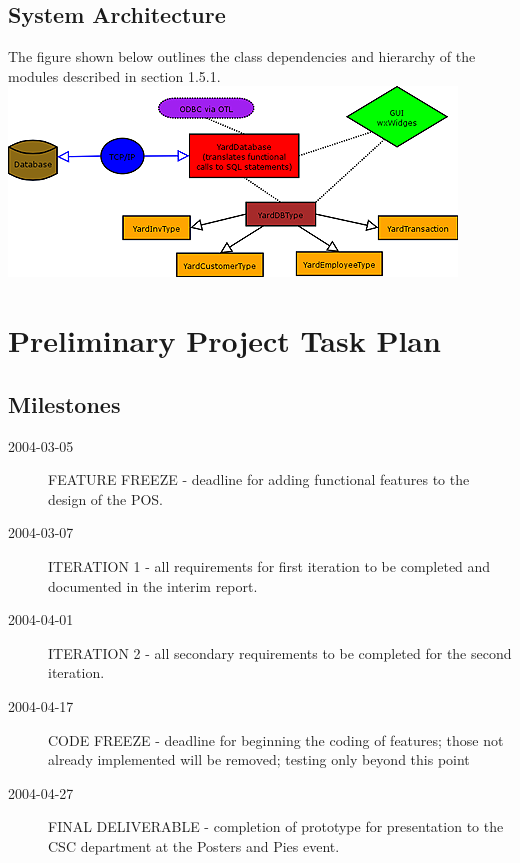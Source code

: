\documentclass{report}
\begin{document}
        \newpage


        \subsection{System Architecture}

            The figure shown below outlines the class dependencies and hierarchy of
            the modules described in section 1.5.1.\\

            \includegraphics{yardsale_modules.png}\\

    \section{Preliminary Project Task Plan}

        \subsection{Milestones}
            \begin{description}
                \item[2004-03-05] FEATURE FREEZE - deadline for adding functional
                features to the design of the POS.

                \item[2004-03-07] ITERATION 1 - all requirements for first
                iteration to be completed and documented in the interim
                report.

                \item[2004-04-01] ITERATION 2 - all secondary requirements
                to be completed for the second iteration.

                \item[2004-04-17] CODE FREEZE - deadline for beginning the
                coding of features; those not already implemented will be removed;
                testing only beyond this point

                \item[2004-04-27] FINAL DELIVERABLE - completion of
                prototype for presentation to the CSC department at the
                Posters and Pies event.
            \end{description}
\end{document}
